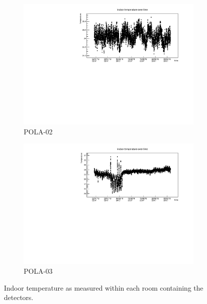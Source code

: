 \documentclass[12pt,a4paper]{amsart}
\begin{document}
\begin{figure}
	\begin{subfigure}[b]{0.6\textwidth}
	\centering
		\includegraphics[width=\textwidth]{../data/plots/POLA-02/IndoorTemp_POLA-02.pdf}
		\caption{POLA-02}
		\label{fig:indoortemp_POLA-02}
	\end{subfigure}%
	\begin{subfigure}[b]{0.6\textwidth}
	\centering
		\includegraphics[width=\textwidth]{../data/plots/POLA-03/IndoorTemp_POLA-03.pdf}
		\caption{POLA-03}
		\label{fig:indoortemp_POLA-03}
	\end{subfigure}
	\caption{Indoor temperature as measured within each room containing the detectors.}
	\label{fig:indoortemp}
\end{figure}
\end{document}
